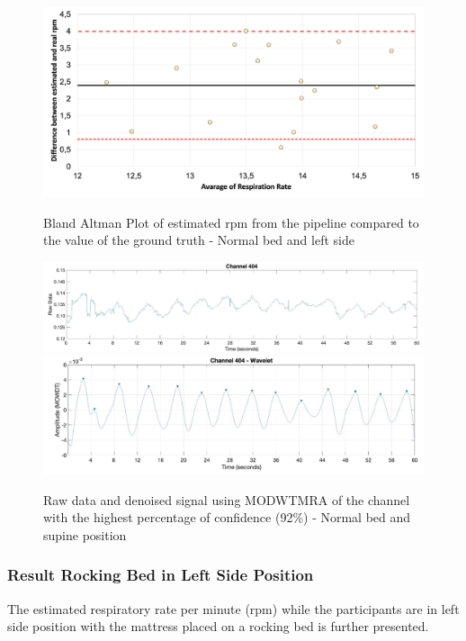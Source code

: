 \begin{figure}[p]
  \centering
  \includegraphics[width=\textwidth]{img/balnd4.png}

  \caption{Bland Altman Plot of estimated rpm from the pipeline compared to the value of the ground truth - Normal bed and left side}
  \label{fig:baln4}
  \vspace{1.5cm}
  \includegraphics[width=\textwidth]{img/404.jpg}
  \includegraphics[width=\textwidth]{img/404_wave.jpg}
\caption{Raw data and denoised signal using MODWTMRA of the channel with the highest percentage of confidence (92\%) - Normal bed and supine position}
  \label{fig:rec4}
\end{figure}


\clearpage
\subsubsection{Result Rocking Bed in Left Side Position}  %

The estimated respiratory rate per minute (rpm) while the participants are in left side position with the mattress placed on a rocking bed is further presented. 

